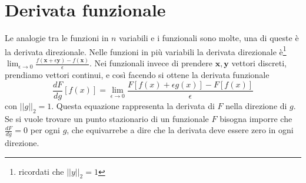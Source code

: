 \documentclass[11pt,a4paper]{article}
\theoremstyle{definition}
\theoremstyle{plain}
\theoremstyle{plain}
\begin{document}
	\section{Derivata funzionale}
		Le analogie tra le funzioni in $n$ variabili e i funzionali sono molte, una di queste è la derivata direzionale.\newline
		Nelle funzioni in più variabili la derivata direzionale è\footnote{ricordati che $||y||_2=1$} $\lim_{\epsilon \to 0}\frac{f(\mathbf{x}+\epsilon\mathbf{y})-f(\mathbf{x})}{\epsilon}$. Nei funzionali invece di prendere $\mathbf{x},\mathbf{y}$ vettori discreti, prendiamo vettori continui, e così facendo si ottene la derivata funzionale
		\begin{equation}
			\frac{dF}{dg}[f(x)]=\lim_{\epsilon \to 0}\frac{F[f(x)+\epsilon g(x)]-F[f(x)]}{\epsilon}
		\end{equation}
		con $||g||_2=1$. Questa equazione rappresenta la derivata di $F$ nella direzione di $g$.\newline
		Se si vuole trovare un punto stazionario di un funzionale $F$ bisogna imporre che $\frac{dF}{dg}=0$ per ogni $g$, che equivarrebe a dire che la derivata deve essere zero in ogni direzione.\newline
\end{document}
